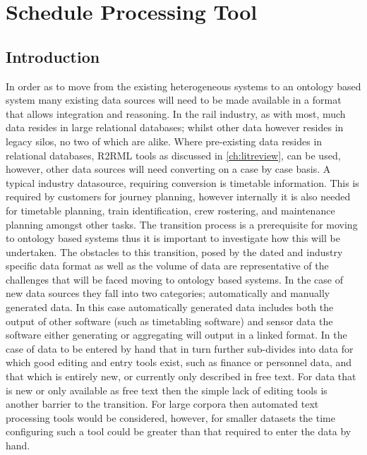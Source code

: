 \chapter{Schedule Processing Tool}\label{ch:cifparser}
 \section{Introduction}
In order as to move from the existing heterogeneous systems to an ontology based system many existing data sources will need to be made available in a format that allows integration and reasoning. In the rail industry, as with most, much data resides in large relational databases; whilst other data however resides in legacy silos, no two of which are alike. Where pre-existing data resides in relational databases, R2RML tools as discussed in \autoref{ch:litreview}, can be used, however, other data sources will need converting on a case by case basis. A typical industry datasource, requiring conversion is timetable information. This is required by customers for journey planning, however internally it is also needed for timetable planning, train identification, crew rostering, and maintenance planning amongst other tasks. The transition process is a prerequisite for moving to ontology based systems thus it is important to investigate how this will be undertaken. The obstacles to this transition, posed by the dated and industry specific data format as well as the volume of data are representative of the challenges that will be faced moving to ontology based systems. In the case of new data sources they fall into two categories; automatically and manually generated data. In this case automatically generated data includes both the output of other software (such as timetabling software) and sensor data the software either generating or aggregating will output in a linked format. In the case of data to be entered by hand that in turn further sub-divides into data for which good editing and entry tools exist, such as finance or personnel data, and that which is entirely new, or currently only described in free text. For data that is new or only available as free text then the simple lack of editing tools is another barrier to the transition. For large corpora then automated text processing tools would be considered, however, for smaller datasets the time configuring such a tool could be greater than that required to enter the data by hand.


